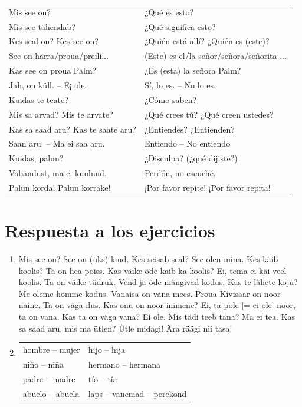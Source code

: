 \begin{tabular}{ l l }
	Mis see on?							& ¿Qué es esto? \\
	Mis see tähendab?					& ¿Qué significa esto? \\
	Kes seal on? Kes see on? 			& ¿Quién está allí? ¿Quién es (este)? \\
	See on härra/proua/preili... 		& (Este) es el/la señor/señora/señorita ...\\
	Kas see on proua Palm?				& ¿Es (esta) la señora Palm? \\
	Jah, on küll. -- E¡ ole.			& Sí, lo es. -- No lo es. \\
	Kuidas te teate?					& ¿Cómo saben? \\
	Mis sa arvad? Mis te arvate?		& ¿Qué crees tú? ¿Qué creen ustedes? \\
	Kas sa saad aru? Kas te saate aru? 	& ¿Entiendes? ¿Entienden? \\
	Saan aru. -- Ma ei saa aru.			& Entiendo -- No entiendo \\
	Kuidas, palun?						& ¿Disculpa? (¿qué dijiste?) \\
	Vabandust, ma ei kuulnud.			& Perdón, no escuché. \\
	Palun korda! Palun korrake!			& ¡Por favor repite! ¡Por favor repita!  
\end{tabular}
\bigskip

\Large{\section*{Respuesta a los ejercicios}}

\begin{enumerate}
	\item Mis see on? See on (üks) laud. Kes seisab seal? See olen mina. Kes käib koolis? Ta on hea poiss. Kas väike õde käib ka koolis? Ei, tema ei käi veel koolis. Ta on väike tüdruk. Vend ja õde mängivad kodus. Kas te lähete koju? Me oleme homme kodus. Vanaisa on vana mees. Proua Kivisaar on noor naine. Ta on väga ilus. Kas onu on noor inimene? Ei, ta pole [= ei ole] noor, ta on vana. Kas ta on väga vana? Ei ole. Mis tädi teeb täna? Ma ei tea. Kas sa saad aru, mis ma ütlen? Ütle midagi! Ära räägi nii tasa!

	\item 
	\begin{tabular}{ l l }
		hombre -- mujer		& hijo -- hija \\
		niño -- niña		& hermano -- hermana \\
		padre -- madre		& tío -- tía \\
		abuelo -- abuela	& laps -- vanemad -- perekond 
	\end{tabular}
\end{enumerate}

